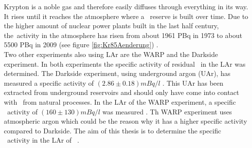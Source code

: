 \documentclass[encoding=utf8,british]{tumphthesis}
\begin{document}
Krypton is a noble gas and therefore easily diffuses through everything in its way.
It rises until it reaches the atmosphere where a \Kr\ reserve is built over time.  
Due to the higher amount of nuclear power plants built in the last half century, the\Kr\ activity in the atmosphere has risen from about 1961 PBq in 1973 \cite{telegadas_atmospheric_1975} to about 5500 PBq in 2009 (see figure \ref{fig:Kr85Aenderung}) \cite{ahlswede_update_2013}.
\\

Two other experiments also using LAr are the WARP and the Darkside experiment.
In both experiments the specific activity of residual \Kr\ in the LAr was determined.
The Darkside experiment, using underground argon (UAr), has measured a specific activity of \((2.86\pm0.18) \unit{mBq}/\unit{l}\)  \cite{agnes_results_2016}.
This UAr has been extracted from underground reservoirs and should only have come into contact with \Kr\ from natural processes.
In the LAr of the WARP experiment, a specific \Kr\ activity of   \((160\pm130) \unit{mBq}/\unit{l}\) was measured \cite{benetti_measurement_2006}.
Th WARP experiment uses atmospheric argon which could be the reason why it has a higher specific activity compared to Darkside.
The aim of this thesis is to determine the specific \Kr\ activity in the LAr of \gerda\ \PII.

 
 
 
 
 
 
 
 
 
 
 
 
 
 
 
 
 
 
 
 
\end{document}
